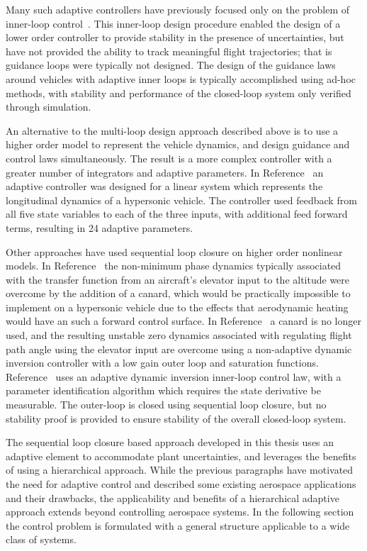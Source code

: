 Many such adaptive controllers have previously focused only on the problem of inner-loop control\ \cite{mcfarland.autopilot.1996, qu.gnc.2013, wiese.adaptive.2013, wiese.gnc.2015, wiese.jgcd.2015, wise.munition.2005, wise.autopilot.2008}.
This inner-loop design procedure enabled the design of a lower order controller to provide stability in the presence of uncertainties, but have not provided the ability to track meaningful flight trajectories;  that is guidance loops were typically not designed.
The design of the guidance laws around vehicles with adaptive inner loops is typically accomplished using ad-hoc methods, with stability and performance of the closed-loop system only verified through simulation.

An alternative to the multi-loop design approach described above is to use a higher order model to represent the vehicle dynamics, and design guidance and control laws simultaneously.
The result is a more complex controller with a greater number of integrators and adaptive parameters.
In Reference\ \cite{gibson.adaptive.2008} an adaptive controller was designed for a linear system which represents the longitudinal dynamics of a hypersonic vehicle.
The controller used feedback from all five state variables to each of the three inputs, with additional feed forward terms, resulting in 24 adaptive parameters.

Other approaches have used sequential loop closure on higher order nonlinear models.
In Reference\ \cite{fiorentini.canard.2008} the non-minimum phase dynamics typically associated with the transfer function from an aircraft's elevator input to the altitude were overcome by the addition of a canard, which would be practically impossible to implement on a hypersonic vehicle due to the effects that aerodynamic heating would have an such a forward control surface.
In Reference\ \cite{fiorentini.nmp.2009} a canard is no longer used, and the resulting unstable zero dynamics associated with regulating flight path angle using the elevator input are overcome using a non-adaptive dynamic inversion controller with a low gain outer loop and saturation functions.
Reference\ \cite{bodson.autopilot.2003} uses an adaptive dynamic inversion inner-loop control law, with a parameter identification algorithm which requires the state derivative be measurable.
The outer-loop is closed using sequential loop closure, but no stability proof is provided to ensure stability of the overall closed-loop system.

The sequential loop closure based approach developed in this thesis uses an adaptive element to accommodate plant uncertainties, and leverages the benefits of using a hierarchical approach.
While the previous paragraphs have motivated the need for adaptive control and described some existing aerospace applications and their drawbacks, the applicability and benefits of a hierarchical adaptive approach extends beyond controlling aerospace systems.
In the following section the control problem is formulated with a general structure applicable to a wide class of systems.

